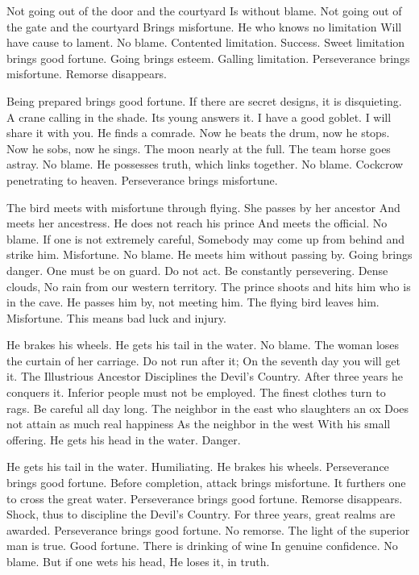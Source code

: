 {Not going out of the door and the courtyard
 Is without blame.}
{Not going out of the gate and the courtyard
 Brings misfortune.}
{He who knows no limitation
 Will have cause to lament.
 No blame.}
{Contented limitation. Success.}
{Sweet limitation brings good fortune.
 Going brings esteem.}
{Galling limitation.
 Perseverance brings misfortune.
 Remorse disappears.}

{Being prepared brings good fortune.
 If there are secret designs, it is disquieting.}
{A crane calling in the shade.
 Its young answers it.
 I have a good goblet.
 I will share it with you.}
{He finds a comrade.
 Now he beats the drum, now he stops.
 Now he sobs, now he sings.}
{The moon nearly at the full.
 The team horse goes astray.
 No blame.}
{He possesses truth, which links together.
 No blame.}
{Cockcrow penetrating to heaven.
 Perseverance brings misfortune.}

{The bird meets with misfortune through flying.}
{She passes by her ancestor
 And meets her ancestress.
 He does not reach his prince
 And meets the official.
 No blame.}
{If one is not extremely careful,
 Somebody may come up from behind and strike him.
 Misfortune.}
{No blame. He meets him without passing by.
 Going brings danger. One must be on guard.
 Do not act. Be constantly persevering.}
{Dense clouds,
 No rain from our western territory.
 The prince shoots and hits him who is in the cave.}
{He passes him by, not meeting him.
 The flying bird leaves him.
 Misfortune.
 This means bad luck and injury.}

{He brakes his wheels.
 He gets his tail in the water.
 No blame.}
{The woman loses the curtain of her carriage.
 Do not run after it;
 On the seventh day you will get it.}
{The Illustrious Ancestor
 Disciplines the Devil’s Country.
 After three years he conquers it.
 Inferior people must not be employed.}
{The finest clothes turn to rags.
 Be careful all day long.}
{The neighbor in the east who slaughters an ox
 Does not attain as much real happiness
 As the neighbor in the west
 With his small offering.}
{He gets his head in the water. Danger.}

{He gets his tail in the water.
 Humiliating.}
{He brakes his wheels.
 Perseverance brings good fortune.}
{Before completion, attack brings misfortune.
 It furthers one to cross the great water.}
{Perseverance brings good fortune.
 Remorse disappears.
 Shock, thus to discipline the Devil’s Country.
 For three years, great realms are awarded.}
{Perseverance brings good fortune.
 No remorse.
 The light of the superior man is true.
 Good fortune.}
{There is drinking of wine
 In genuine confidence. No blame.
 But if one wets his head,
 He loses it, in truth.}

\endgroup
